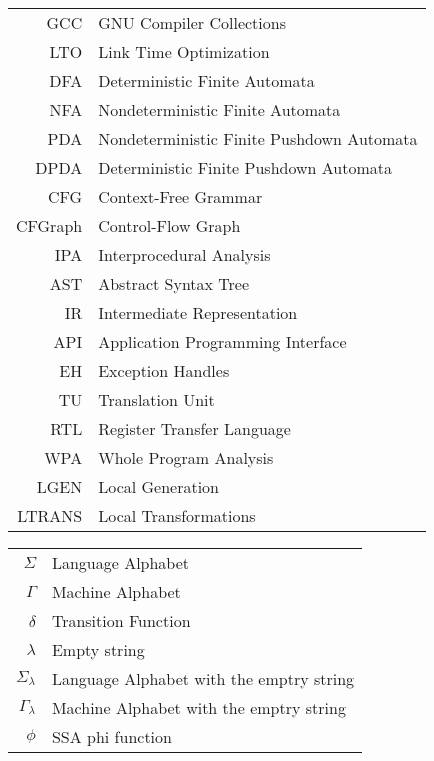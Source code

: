 \begin{tabular}{rl}
	GCC & GNU Compiler Collections \\
	LTO & Link Time Optimization \\
	DFA & Deterministic Finite Automata \\
	NFA & Nondeterministic Finite Automata \\
	PDA & Nondeterministic Finite Pushdown Automata \\
	DPDA & Deterministic Finite Pushdown Automata \\
	CFG & Context-Free Grammar \\
	CFGraph & Control-Flow Graph \\
	IPA & Interprocedural Analysis \\
	AST & Abstract Syntax Tree \\
	IR  & Intermediate Representation \\
	API & Application Programming Interface \\
	EH  & Exception Handles \\
	TU  & Translation Unit \\
	RTL & Register Transfer Language\\
	WPA & Whole Program Analysis\\
	LGEN & Local Generation\\
	LTRANS & Local Transformations\\
\end{tabular}

\newpage

\begin{tabular}{rl}
        $\Sigma$    & Language Alphabet\\
        $\Gamma$    & Machine Alphabet\\
		$\delta$    & Transition Function\\
		$\lambda$ & Empty string\\
		$\Sigma_{\lambda}$ & Language Alphabet with the emptry string\\
		$\Gamma_{\lambda}$ & Machine Alphabet with the emptry string\\
		$\phi$ & SSA phi function\\
\end{tabular}

